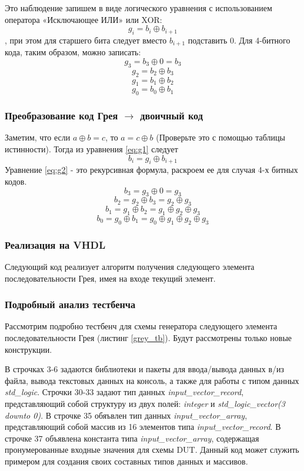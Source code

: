 Это наблюдение запишем в виде логического уравнения с использованием оператора «Исключающее ИЛИ» или XOR: 
\begin{equation}
g_{i}=b_{i} \oplus b_{i+1}
\label{eq:g1}
\end{equation}
, при этом для старшего бита следует вместо $b_{i+1}$ подставить $0$. Для 4-битного кода, таким образом, можно записать:
\[g_{3}=b_{3} \oplus 0=b_{3}\]
\[g_{2}=b_{2} \oplus b_{3}\]
\[g_{1}=b_{1} \oplus b_{2}\]
\[g_{0}=b_{0} \oplus b_{1}\]

\subsubsection{Преобразование код Грея $\to$ двоичный код}

Заметим, что если $a \oplus b = c$, то $a = c \oplus b$ (Проверьте это с помощью таблицы истинности). Тогда из уравнения \ref{eq:g1} следует
\begin{equation}
b_{i}=g_{i} \oplus b_{i+1}
\label{eq:g2}
\end{equation}
Уравнение \ref{eq:g2} - это рекурсивная формула, раскроем ее для случая 4-х битных кодов. 
\[b_{3}=g_{3} \oplus 0 = g_{3}\]
\[b_{2}=g_{2} \oplus b_{3} = g_{2} \oplus g_{3}\]
\[b_{1}=g_{1} \oplus b_{2} = g_{1} \oplus g_{2} \oplus g_{3}\]
\[b_{0}=g_{0} \oplus b_{1} = g_{0} \oplus g_{1} \oplus g_{2} \oplus g_{3}\]

\subsubsection{Реализация на VHDL}

Следующий код реализует алгоритм получения следующего элемента последовательности Грея, имея на входе текущий элемент. 

 

\subsubsection{Подробный анализ тестбенча}

Рассмотрим подробно тестбенч для схемы генератора следующего элемента последовательности Грея (листинг \ref{grey_tb}). Будут рассмотрены только новые конструкции. 

В строчках 3-6 задаются библиотеки и пакеты для ввода/вывода данных в/из файла, вывода текстовых данных на консоль, а также для работы с типом данных \emph{std\_logic}. Строчки 30-33 задают  тип данных \emph{input\_vector\_record}, представляющий собой структуру из двух полей: \emph{integer} и \emph{std\_logic\_vector(3 downto 0)}. В строчке 35 обяъвлен тип данных \emph{input\_vector\_array}, представляющий собой массив из 16 элементов типа \emph{input\_vector\_record}. В строчке 37 объявлена константа типа \emph{input\_vector\_array}, содержащая пронумерованные входные значения для схемы DUT. Данный код может служить примером для создания своих составных типов данных и массивов.  

